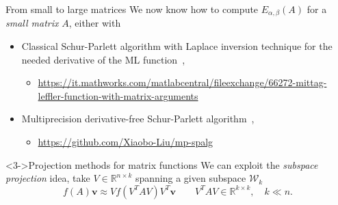 \documentclass[aspectratio=169,xcolor=dvipsnames]{beamer}
\begin{document}
\begin{frame}{From small to large matrices}
We now know how to compute $E_{\alpha,\beta}(A)$ for a \emph{small matrix} $A$, either with
\begin{itemize}
	\item[\faDoorClosed] Classical Schur-Parlett algorithm with Laplace inversion technique for the needed derivative of the ML function~\parencite{MatrixML},
	\begin{itemize}
		\item[\faCode] \href{https://it.mathworks.com/matlabcentral/fileexchange/66272-mittag-leffler-function-with-matrix-arguments}{https://it.mathworks.com/matlabcentral/fileexchange/66272-mittag-leffler-function-with-matrix-arguments}
	\end{itemize}
	\item[\faDoorClosed] Multiprecision derivative-free Schur-Parlett algorithm~\parencite{HighamML},
	\begin{itemize}
		\item[\faCode] \href{https://github.com/Xiaobo-Liu/mp-spalg}{https://github.com/Xiaobo-Liu/mp-spalg}
	\end{itemize}
\end{itemize}
\begin{block}<3->{\faLightbulb\;Projection methods for matrix functions}
We can exploit the \emph{subspace projection} idea, take $V \in \mathbb{R}^{n \times k}$ spanning a given subspace $\mathcal{W}_k$
\[
f(A)\mathbf{v} \approx V f(V^T A V) V^T \mathbf{v} \qquad V^T A V \in \mathbb{R}^{k \times k}, \quad k \ll n. 
\]
\end{block}
\end{frame}
\end{document}
